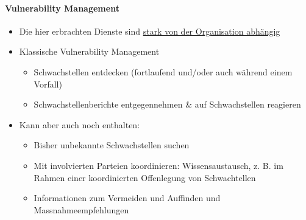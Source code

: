 \paragraph{Vulnerability Management}
\begin{itemize}
    \item Die hier erbrachten Dienste sind \underline{stark von der Organisation abhängig}
    \item \glqq Klassische\grqq{} Vulnerability Management
    \begin{itemize}
        \item Schwachstellen entdecken (fortlaufend und/oder auch während einem Vorfall)
        \item Schwachstellenberichte entgegennehmen \& auf Schwachstellen reagieren
    \end{itemize}
    \item Kann aber auch noch enthalten:
    \begin{itemize}
        \item Bisher unbekannte Schwachstellen suchen
        \item Mit involvierten Parteien koordinieren: Wissensaustausch, z. B. im Rahmen einer koordinierten Offenlegung von Schwachtellen
        \item Informationen zum Vermeiden und Auffinden und Massnahmeempfehlungen
    \end{itemize}
\end{itemize}

